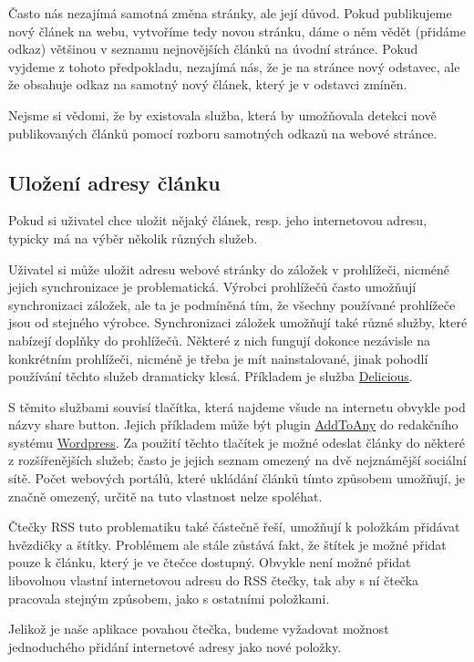 Často nás nezajímá samotná změna stránky, ale její důvod.
Pokud publikujeme nový článek na webu, vytvoříme tedy novou stránku, dáme o něm vědět (přidáme odkaz) většinou v seznamu nejnovějších článků na úvodní stránce.
Pokud vyjdeme z tohoto předpokladu, nezajímá nás, že je na stránce nový odstavec, ale že obsahuje odkaz na samotný nový článek, který je v odstavci zmíněn.

Nejsme si vědomi, že by existovala služba, která by umožňovala detekci nově publikovaných článků pomocí rozboru samotných odkazů na webové stránce.

\subsection{Uložení adresy článku}

Pokud si uživatel chce uložit nějaký článek, resp. jeho internetovou adresu, typicky má na výběr několik různých služeb.

Uživatel si může uložit adresu webové stránky do záložek v prohlížeči, nicméně jejich synchronizace je problematická.
Výrobci prohlížečů často umožňují synchronizaci záložek, ale ta je podmíněná tím, že všechny používané prohlížeče jsou od stejného výrobce.
Synchronizaci záložek umožňují také různé služby, které nabízejí doplňky do prohlížečů.
Některé z nich fungují dokonce nezávisle na konkrétním prohlížeči, nicméně je třeba je mít nainstalované, jinak pohodlí používání těchto služeb dramaticky klesá.
Příkladem je služba \href{https://delicious.com/}{Delicious}.

S těmito službami souvisí tlačítka, která najdeme všude na internetu obvykle pod názvy share button.
Jejich příkladem může být plugin \href{http://wordpress.org/plugins/add-to-any/}{AddToAny} do redakčního systému \href{http://wordpress.org/}{Wordpress}.
Za použití těchto tlačítek je možné odeslat články do některé z rozšířenějších služeb; často je jejich seznam omezený na dvě nejznámější sociální sítě.
Počet webových portálů, které ukládání článků tímto způsobem umožňují, je značně omezený, určitě na tuto vlastnost nelze spoléhat.

Čtečky RSS tuto problematiku také částečně řeší, umožňují k položkám přidávat hvězdičky a štítky.
Problémem ale stále zůstává fakt, že štítek je možné přidat pouze k článku, který je ve čtečce dostupný.
Obvykle není možné přidat libovolnou vlastní internetovou adresu do RSS čtečky, tak aby s ní čtečka pracovala stejným způsobem, jako s ostatními položkami.

Jelikož je naše aplikace povahou čtečka, budeme vyžadovat možnost jednoduchého přidání internetové adresy jako nové položky.

